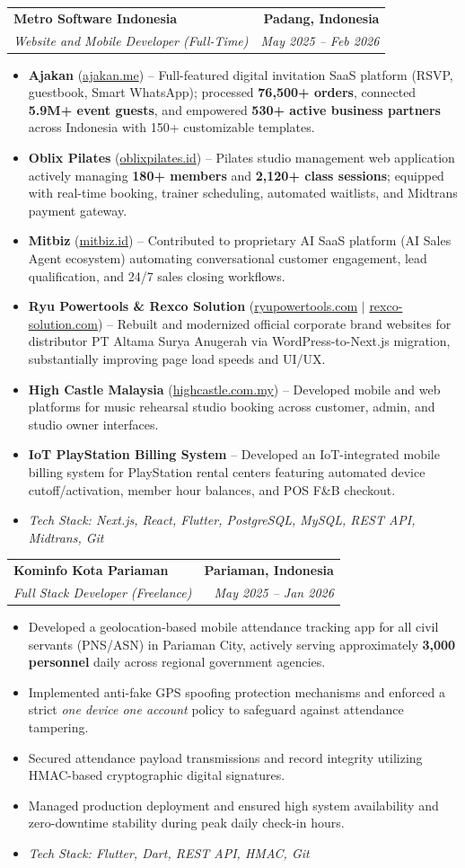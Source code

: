 \documentclass[letterpaper,10pt]{article}
\makeatletter
\newcommand{\resumeItem}[1]{
  \item\small{
    {#1 \vspace{-1.5pt}}
  }
}
\newcommand{\resumeSubheading}[4]{
  \vspace{1pt}\item
    \begin{tabular*}{1.0\textwidth}[t]{l@{\extracolsep{\fill}}r}
      \textbf{#1} & \textbf{\small #2} \\
      \textit{\small#3} & \textit{\small #4} \\
    \end{tabular*}\vspace{-4pt}
}
\newcommand{\resumeItemListStart}{\begin{itemize}[leftmargin=0.15in, label={--}, itemsep=1.5pt, parsep=0pt]}
\newcommand{\resumeItemListEnd}{\end{itemize}\vspace{-2pt}}
\makeatother
\begin{document}
    \resumeSubheading
      {Metro Software Indonesia}{Padang, Indonesia}
      {Website and Mobile Developer \textnormal{(Full-Time)}}{May 2025 -- Feb 2026}
      \resumeItemListStart
        \resumeItem{\textbf{Ajakan} (\href{http://ajakan.me}{ajakan.me}) -- Full-featured digital invitation SaaS platform (RSVP, guestbook, Smart WhatsApp); processed \textbf{76,500+ orders}, connected \textbf{5.9M+ event guests}, and empowered \textbf{530+ active business partners} across Indonesia with 150+ customizable templates.}
        \resumeItem{\textbf{Oblix Pilates} (\href{https://oblixpilates.id}{oblixpilates.id}) -- Pilates studio management web application actively managing \textbf{180+ members} and \textbf{2,120+ class sessions}; equipped with real-time booking, trainer scheduling, automated waitlists, and Midtrans payment gateway.}
        \resumeItem{\textbf{Mitbiz} (\href{https://www.mitbiz.id}{mitbiz.id}) -- Contributed to proprietary AI SaaS platform (AI Sales Agent ecosystem) automating conversational customer engagement, lead qualification, and 24/7 sales closing workflows.}
        \resumeItem{\textbf{Ryu Powertools \& Rexco Solution} (\href{https://ryupowertools.com}{ryupowertools.com} $|$ \href{https://rexco-solution.com}{rexco-solution.com}) -- Rebuilt and modernized official corporate brand websites for distributor PT Altama Surya Anugerah via WordPress-to-Next.js migration, substantially improving page load speeds and UI/UX.}
        \resumeItem{\textbf{High Castle Malaysia} (\href{https://highcastle.com.my}{highcastle.com.my}) -- Developed mobile and web platforms for music rehearsal studio booking across customer, admin, and studio owner interfaces.}
        \resumeItem{\textbf{IoT PlayStation Billing System} -- Developed an IoT-integrated mobile billing system for PlayStation rental centers featuring automated device cutoff/activation, member hour balances, and POS F\&B checkout.}
        \resumeItem{\textit{Tech Stack: Next.js, React, Flutter, PostgreSQL, MySQL, REST API, Midtrans, Git}}
      \resumeItemListEnd

    \resumeSubheading
      {Kominfo Kota Pariaman}{Pariaman, Indonesia}
      {Full Stack Developer \textnormal{(Freelance)}}{May 2025 -- Jan 2026}
      \resumeItemListStart
        \resumeItem{Developed a geolocation-based mobile attendance tracking app for all civil servants (PNS/ASN) in Pariaman City, actively serving approximately \textbf{3,000 personnel} daily across regional government agencies.}
        \resumeItem{Implemented anti-fake GPS spoofing protection mechanisms and enforced a strict \textit{one device one account} policy to safeguard against attendance tampering.}
        \resumeItem{Secured attendance payload transmissions and record integrity utilizing HMAC-based cryptographic digital signatures.}
        \resumeItem{Managed production deployment and ensured high system availability and zero-downtime stability during peak daily check-in hours.}
        \resumeItem{\textit{Tech Stack: Flutter, Dart, REST API, HMAC, Git}}
      \resumeItemListEnd
\end{document}
